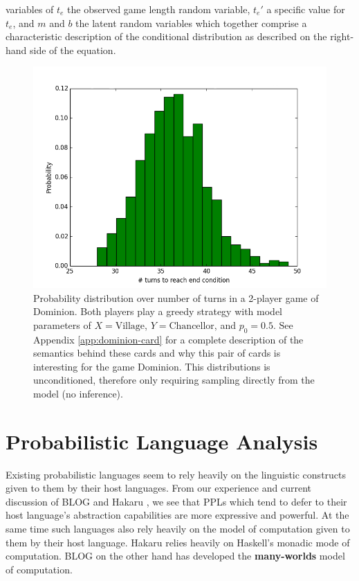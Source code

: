 variables of $t_e$ the observed game
length random variable, $t_e'$ a specific value for $t_e$, and
$m$ and $b$ the latent random variables which together comprise
a characteristic description of the conditional distribution
as described on the right-hand side of the equation.


\begin{figure}
\includegraphics[width=.95\columnwidth]{../pres/village-chancellor-turn-dist.png}
\caption{\label{fig:turn-dist} Probability distribution over number of turns
in a 2-player game of Dominion.
Both players play a greedy strategy with model
parameters of $X = \textrm{Village}$, $Y = \textrm{Chancellor}$, and
$p_0 = 0.5$. See Appendix \ref{app:dominion-card} for a complete description
of the semantics behind these cards and why this pair of cards is interesting
for the game Dominion.
This distributions is unconditioned, therefore only requiring sampling directly
from the model (no inference).
}\end{figure}



\section{Probabilistic Language Analysis} \label{sec:meta-analysis}

Existing probabilistic languages seem to rely heavily on the linguistic
constructs given to them by their host languages. From our experience and
current discussion of BLOG \cite{BlOG} and Hakaru \cite{hakaru}, we see that PPLs
which tend to defer to their host language's abstraction capabilities are more
expressive and powerful. At the same time such languages also rely
heavily on the model of computation given to them by their host language.
Hakaru relies heavily on Haskell's monadic mode of computation. BLOG on
the other hand has developed the {\bf many-worlds} model of computation.

